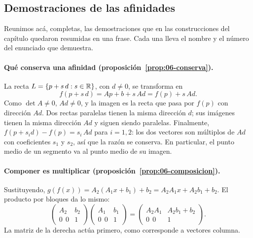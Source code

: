 \subsection{Demostraciones de las afinidades}\label{sec:demos-afinidades}

Reunimos acá, completas, las demostraciones que en las construcciones del capítulo quedaron
resumidas en una frase. Cada una lleva el nombre y el número del enunciado que demuestra.

\paragraph{Qué conserva una afinidad (proposición~\ref{prop:06-conserva}).}
\begin{demostracion}
La recta \(L=\{p+s\,d : s\in\mathbb{R}\}\), con \(d\neq0\), se transforma en
\[
  f(p+s\,d)=Ap+b+s\,Ad=f(p)+s\,Ad .
\]
Como \(\det A\neq0\), \(Ad\neq0\), y la imagen es la recta que pasa por \(f(p)\) con dirección
\(Ad\). Dos rectas paralelas tienen la misma dirección \(d\); sus imágenes tienen la misma
dirección \(Ad\) y siguen siendo paralelas. Finalmente, \(f(p+s_id)-f(p)=s_i\,Ad\) para
\(i=1,2\): los dos vectores son múltiplos de \(Ad\) con coeficientes \(s_1\) y \(s_2\), así que
la razón se conserva. En particular, el punto medio de un segmento va al punto medio de su
imagen.
\end{demostracion}

\paragraph{Componer es multiplicar (proposición~\ref{prop:06-composicion}).}
\begin{demostracion}
Sustituyendo, \(g(f(x))=A_2(A_1x+b_1)+b_2=A_2A_1x+A_2b_1+b_2\). El producto por bloques da lo
mismo:
\[
\begin{pmatrix}A_2&b_2\\0\ \ 0&1\end{pmatrix}
\begin{pmatrix}A_1&b_1\\0\ \ 0&1\end{pmatrix}
=
\begin{pmatrix}A_2A_1&A_2b_1+b_2\\0\ \ 0&1\end{pmatrix}.
\]
La matriz de la derecha actúa primero, como corresponde a vectores columna.
\end{demostracion}

